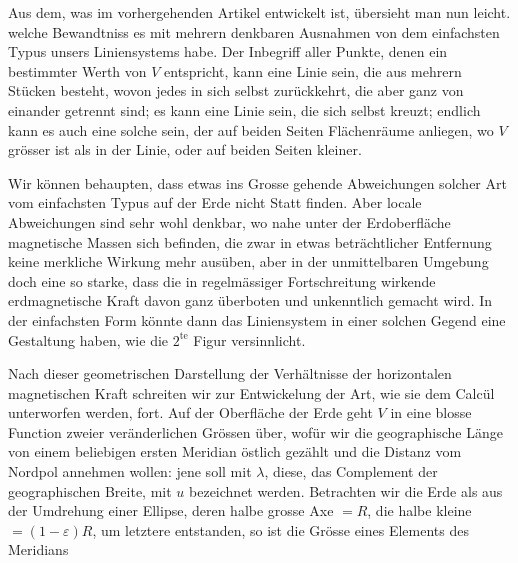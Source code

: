 Aus dem, was im vorhergehenden Artikel entwickelt ist, übersieht man nun leicht. welche Bewandtniss es mit mehrern denkbaren Ausnahmen von dem einfachsten Typus unsers Liniensystems habe. Der Inbegriff aller Punkte, denen ein bestimmter Werth von $V$ entspricht, kann eine Linie sein, die aus mehrern Stücken besteht, wovon jedes in sich selbst zurückkehrt, die aber ganz von einander getrennt sind; es kann eine Linie sein, die sich selbst kreuzt; endlich kann es auch eine solche sein, der auf beiden Seiten Flächenräume anliegen, wo $V$ grösser ist als in der Linie, oder auf beiden Seiten kleiner.

Wir können behaupten, dass etwas ins Grosse gehende Abweichungen solcher Art vom einfachsten Typus auf der Erde nicht Statt finden. Aber locale Abweichungen sind sehr wohl denkbar, wo nahe unter der Erdoberfläche magnetische Massen sich befinden, die zwar in etwas beträchtlicher Entfernung keine merkliche Wirkung mehr ausüben, aber in der unmittelbaren Umgebung doch eine so starke, dass die in regelmässiger Fortschreitung wirkende erdmagnetische Kraft davon ganz überboten und unkenntlich gemacht wird. In der einfachsten Form könnte dann das Liniensystem in einer solchen Gegend eine Gestaltung haben, wie die $2^{\mathrm{te}}$ Figur versinnlicht.

Nach dieser geometrischen Darstellung der Verhältnisse der horizontalen magnetischen Kraft schreiten wir zur Entwickelung der Art, wie sie dem Calcül unterworfen werden, fort. Auf der Oberfläche der Erde geht $V$ in eine blosse Function zweier veränderlichen Grössen über, wofür wir die geographische Länge von einem beliebigen ersten Meridian östlich gezählt und die Distanz vom Nordpol annehmen wollen: jene soll mit $\lambda$, diese, das Complement der geographischen Breite, mit $u$ bezeichnet werden. Betrachten wir die Erde als aus der Umdrehung einer Ellipse, deren halbe grosse Axe $=R$, die halbe kleine $=(1-\varepsilon)R$, um letztere entstanden, so ist die Grösse eines Elements des Meridians
\par{}
